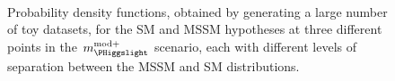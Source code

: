\begin{figure}[h!]
\begin{center}
~\\
\end{center}
\caption[Probability density functions for the \ac{SM} and \ac{MSSM} hypotheses at three different points in the $m_{\PHiggslight}^{\text{mod+}}$ scenario.]{Probability density functions, obtained by generating a large number of toy datasets, for the \ac{SM} and \ac{MSSM} hypotheses at three different points in the $m_{\PHiggslight}^{\text{mod+}}$
scenario, each with different levels of separation between the \ac{MSSM} and \ac{SM} distributions.}
\label{fig:mssm_mssmvssm_toys}
\end{figure}

